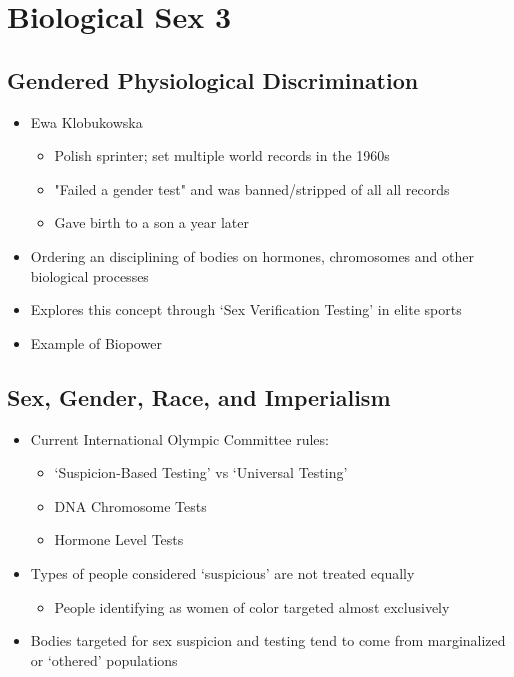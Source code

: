 \documentclass[a4paper]{article}
\begin{document}
\setcounter{section}{7}
\section{Biological Sex 3} %

\subsection{Gendered Physiological Discrimination}
\begin{itemize}
\item Ewa Klobukowska \begin{itemize}
\item Polish sprinter; set multiple world records in the 1960s
\item "Failed a gender test" and was banned/stripped of all all records
\item Gave birth to a son a year later
\end{itemize}
\item Ordering an disciplining of bodies on hormones, chromosomes and other biological processes
\item Explores this concept through `Sex Verification Testing' in elite sports
\item Example of Biopower
\end{itemize}

\subsection{Sex, Gender, Race, and Imperialism}
\begin{itemize}
\item Current International Olympic Committee rules: \begin{itemize}
\item `Suspicion-Based Testing' vs `Universal Testing'
\item DNA Chromosome Tests
\item Hormone Level Tests
\end{itemize}
\item Types of people considered `suspicious' are not treated equally \begin{itemize}
\item People identifying as women of color targeted almost exclusively
\end{itemize}
\item Bodies targeted for sex suspicion and testing tend to come from marginalized or `othered' populations
\end{itemize}
\end{document}
